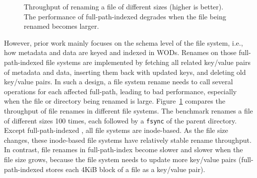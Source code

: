 \begin{figure}[t]
    \centering
    \caption[The performance of file renames in full-path-indexed file systems]{\label{fig:file_rename_intro}
        Throughput of renaming a file of different sizes (higher is better).
        The performance of full-path-indexed \betrfsThree
        degrades when the file being renamed becomes larger.}
\end{figure}

However, prior work mainly focuses on the schema level of the file system, i.e.,
how metadata and data are keyed and indexed in WODs.
Renames on those full-path-indexed file systems are implemented by fetching all
related key/value pairs of metadata and data,
inserting them back with updated keys, and deleting old key/value pairs.
In such a design, a file system rename needs to call several operations for each
affected full-path, leading to bad performance,
especially when the file or directory being renamed is large.
Figure~\ref{fig:file_rename_intro} compares the throughput of file renames in
different file systems.
The benchmark renames a file of different sizes 100 times, each followed by a
\texttt{fsync} of the parent directory.
Except full-path-indexed \betrfsThree, all file systems are inode-based.
As the file size changes, these inode-based file systems have relatively
stable rename throughput.
In contrast, file renames in full-path-index \betrfsThree become slower and
slower when the file size grows,
because the file system needs to update more key/value pairs
(full-path-indexed \betrfsThree stores each 4KiB block of a file as
a key/value pair).

